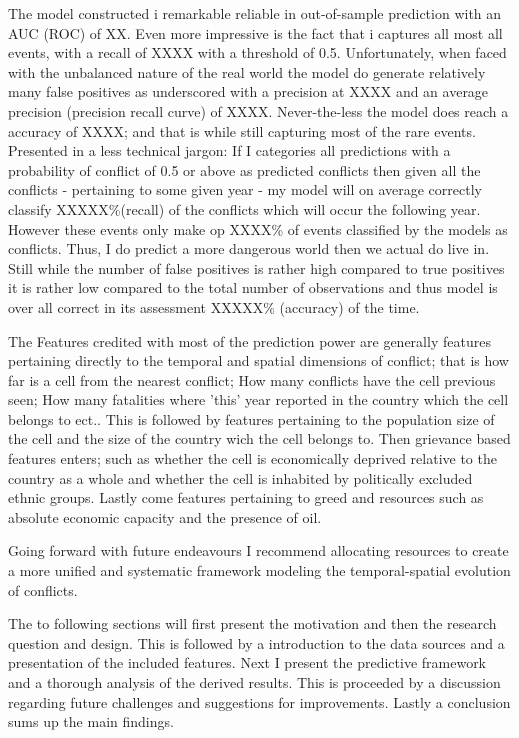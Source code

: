 \documentclass[a4paper]{article}
\begin{document}

The model constructed i remarkable reliable in out-of-sample prediction with an AUC (ROC) of XX. Even more impressive is the fact that i captures all most all events, with a recall of XXXX with a threshold of 0.5. Unfortunately, when faced with the unbalanced nature of the real world the model do generate relatively many false positives as underscored with a precision at XXXX and an average precision (precision recall curve) of XXXX. Never-the-less the model does reach a accuracy of XXXX; and that is while still capturing most of the rare events. Presented in a less technical jargon: If I categories all predictions with a probability of conflict of 0.5 or above as predicted conflicts then given all the conflicts - pertaining to some given year - my model will on average correctly classify XXXXX\%(recall) of the conflicts which will occur the following year. However these events only make op XXXX\% of events classified by the models as conflicts. Thus, I do predict a more dangerous world then we actual do live in. Still while the number of false positives is rather high compared to true positives it is rather low compared to the total number of observations and thus model is over all correct in its assessment XXXXX\% (accuracy) of the time.\par

The Features credited with most of the prediction power are generally features pertaining directly to the temporal and spatial dimensions of conflict; that is how far is a cell from the nearest conflict; How many conflicts have the cell previous seen; How many fatalities where 'this' year reported in the country which the cell belongs to ect.. This is followed by features pertaining to the population size of the cell and the size of the country wich the cell belongs to. Then grievance based features enters; such as whether the cell is economically deprived relative to the country as a whole and whether the cell is inhabited by politically excluded ethnic groups. Lastly come features pertaining to greed and resources such as absolute economic capacity and the presence of oil.\par

Going forward with future endeavours I recommend allocating resources to create a more unified and systematic framework modeling the temporal-spatial evolution of conflicts.


The to following sections will first present the motivation and then the research question and design. This is followed by a introduction to the data sources and a presentation of the included features. Next I present the predictive framework and a thorough analysis of the derived results. This is proceeded by a discussion regarding future challenges and suggestions for improvements. Lastly a conclusion sums up the main findings.\par
\end{document}
